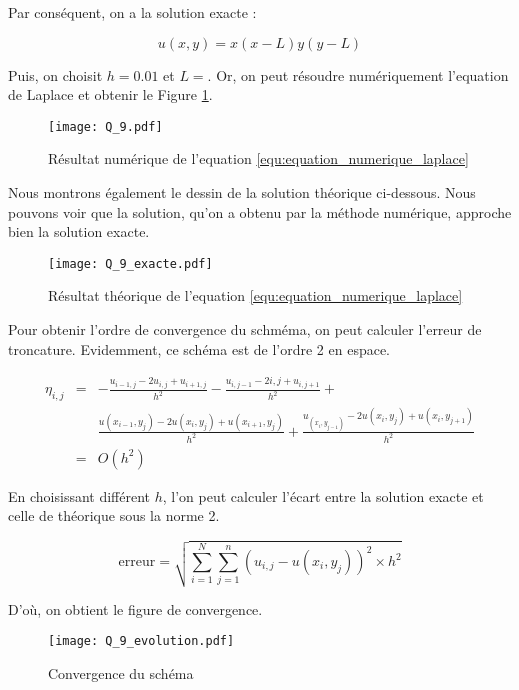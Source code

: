 \documentclass[titlepage,11pt,a4paper]{article}
\begin{document}
Par conséquent, on a la solution exacte :

$$
u(x, y) = x(x-L)y(y-L)
$$

Puis, on choisit $h = 0.01$ et $L = $. Or, on peut résoudre numériquement l'equation de Laplace et obtenir le Figure \ref{fig:numerical_result}.

\begin{figure}[h]
\centering
\texttt{[image: Q\_9.pdf]}
\caption{Résultat numérique de l'equation \ref{equ:equation_numerique_laplace}}
\label{fig:numerical_result}
\end{figure}
\newpage


Nous montrons également le dessin de la solution théorique ci-dessous. Nous pouvons voir que la solution, qu'on a obtenu par la méthode numérique, approche bien la solution exacte.

\begin{figure}[h]
\centering
\texttt{[image: Q\_9\_exacte.pdf]}
\caption{Résultat théorique de l'equation \ref{equ:equation_numerique_laplace}}
\label{fig:theoretical_result}
\end{figure}

Pour obtenir l'ordre de convergence du schméma, on peut calculer l'erreur de troncature. Evidemment, ce schéma est de l'ordre 2 en espace.

$$
\begin{array}{lll}

\eta_{i,j} &=& -\displaystyle\frac{u_{i-1, j} - 2u_{i,j} + u_{i+1, j}}{h^2} - \displaystyle\frac{u_{i, j-1} - 2{i,j} + u_{i, j+1}}{h^2} +\\

&&\displaystyle\frac{u(x_{i-1}, y_j) - 2u(x_i,y_j) + u(x_{i+1}, y_j)}{h^2} + \displaystyle\frac{u_(x_i, y_{j-1}) - 2u(x_i,y_j) + u(x_i, y_{j+1})}{h^2}\\
&=&O(h^2)

\end{array}
$$

En choisissant différent $h$, l'on peut calculer l'écart entre la solution exacte et celle de théorique sous la norme 2.

$$
\mbox{erreur} = \sqrt{\sum_{i=1}^{N}\sum_{j=1}^{n}(u_{i,j} - u(x_i, y_j))^2 \times h^2}
$$

D'où, on obtient le figure de convergence.

\begin{figure}[h]
\centering
\texttt{[image: Q\_9\_evolution.pdf]}
\caption{Convergence du schéma}
\label{fig:convergence_scheme}
\end{figure}
\end{document}
